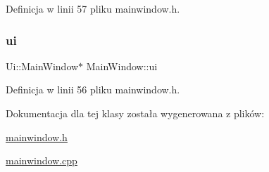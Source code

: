 Definicja w linii 57 pliku mainwindow.\+h.

\mbox{\label{class_main_window_a35466a70ed47252a0191168126a352a5}} 
\subsubsection{\texorpdfstring{ui}{ui}}
{\footnotesize\ttfamily Ui\+::\+Main\+Window$\ast$ Main\+Window\+::ui\hspace{0.3cm}{\ttfamily [private]}}



Definicja w linii 56 pliku mainwindow.\+h.



Dokumentacja dla tej klasy została wygenerowana z plików\+:\begin{DoxyCompactItemize}
\item 
\hyperlink{mainwindow_8h}{mainwindow.\+h}\item 
\hyperlink{mainwindow_8cpp}{mainwindow.\+cpp}\end{DoxyCompactItemize}
